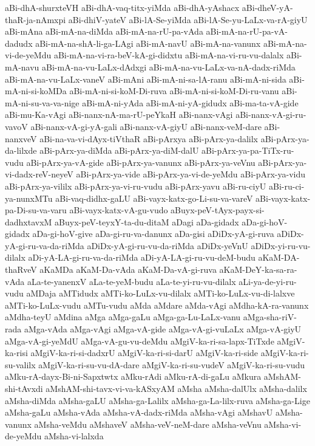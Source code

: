 {aBi-dhA-shurxteVH
aBi-dhA-vaq-titx-yiMda
aBi-dhA-yAshacx
aBi-dheV-yA-thaR-ja-nAmxpi
aBi-dhiV-yateV
aBi-lA-Se-yiMda
aBi-lA-Se-yu-LaLx-va-rA-giyU
aBi-mAna
aBi-mA-na-diMda
aBi-mA-na-rU-pa-vAda
aBi-mA-na-rU-pa-vA-dadudx
aBi-mA-na-shA-li-ga-LAgi
aBi-mA-navU
aBi-mA-na-vanunx
aBi-mA-na-vi-de-yeMdu
aBi-mA-na-vi-ra-beV-kA-gi-didxtu
aBi-mA-na-vi-ru-vu-dalalx
aBi-mA-navu
aBi-mA-na-vu-LaLx-dAdxgi
aBi-mA-na-vu-LaLx-va-nA-dadx-riMda
aBi-mA-na-vu-LaLx-vaneV
aBi-mAni
aBi-mA-ni-sa-lA-ranu
aBi-mA-ni-sida
aBi-mA-ni-si-koMDa
aBi-mA-ni-si-koM-Di-ruva
aBi-mA-ni-si-koM-Di-ru-vanu
aBi-mA-ni-su-va-va-nige
aBi-mA-ni-yAda
aBi-mA-ni-yA-gidudx
aBi-ma-ta-vA-gide
aBi-mu-Ka-vAgi
aBi-nanx-nA-ma-rU-peYkaH
aBi-nanx-vAgi
aBi-nanx-vA-gi-ru-vavoV
aBi-nanx-vA-gi-yA-gali
aBi-nanx-vA-giyU
aBi-nanx-veM-dare
aBi-nanxveV
aBi-na-va-vi-dAyx-tiVthaR
aBi-pArxya
aBi-pArx-ya-dalilx
aBi-pArx-ya-da-lilxde
aBi-pArx-ya-diMda
aBi-pArx-ya-diM-dalU
aBi-pArx-ya-pa-TiTx-ru-vudu
aBi-pArx-ya-vA-gide
aBi-pArx-ya-vanunx
aBi-pArx-ya-veVnu
aBi-pArx-ya-vi-dadx-reV-neyeV
aBi-pArx-ya-vide
aBi-pArx-ya-vi-de-yeMdu
aBi-pArx-ya-vidu
aBi-pArx-ya-vililx
aBi-pArx-ya-vi-ru-vudu
aBi-pArx-yavu
aBi-ru-ciyU
aBi-ru-ci-ya-nunxMTu
aBi-vaq-didhx-gaLU
aBi-vayx-katx-go-Li-su-va-vareV
aBi-vayx-katx-pa-Di-su-va-varu
aBi-vayx-katx-vA-gu-vudo
aBuyx-peV-tAyx-payx-si-dadhxtavxM
aBuyx-peV-teyxY-ta-du-ditaM
aDagi
aDa-gidadx
aDa-gi-hoV-gidadx
aDa-gi-hoV-give
aDa-gi-ru-va-danunx
aDa-gisi
aDiDx-yA-gi-ruva
aDiDx-yA-gi-ru-va-da-riMda
aDiDx-yA-gi-ru-vu-da-riMda
aDiDx-yeVnU
aDiDx-yi-ru-vu-dilalx
aDi-yA-LA-gi-ru-va-da-riMda
aDi-yA-LA-gi-ru-vu-deM-budu
aKaM-DA-thaRveV
aKaMDa
aKaM-Da-vAda
aKaM-Da-vA-gi-ruva
aKaM-DeY-ka-sa-ra-vAda
aLa-te-yanenxV
aLa-te-yeM-budu
aLa-te-yi-ru-vu-dilalx
aLi-ya-de-yi-ru-vudu
aMDaja
aMTidudx
aMTi-ko-LuLx-vu-dilalx
aMTi-ko-LuLx-vu-di-lalxve
aMTi-ko-LuLx-vudu
aMTu-vudu
aMda
aMdare
aMda-vAgi
aMdha-kA-ra-vanunx
aMdha-teyU
aMdina
aMga
aMga-gaLu
aMga-ga-Lu-LaLx-vanu
aMga-sha-riV-rada
aMga-vAda
aMga-vAgi
aMga-vA-gide
aMga-vA-gi-vuLaLx
aMga-vA-giyU
aMga-vA-gi-yeMdU
aMga-vA-gu-vu-deMdu
aMgiV-ka-ri-sa-lapx-TiTxde
aMgiV-ka-risi
aMgiV-ka-ri-si-dadxrU
aMgiV-ka-ri-si-darU
aMgiV-ka-ri-side
aMgiV-ka-ri-su-valilx
aMgiV-ka-ri-su-vu-dA-dare
aMgiV-ka-ri-su-vudeV
aMgiV-ka-ri-su-vudu
aMku-rA-dayx-Bi-ni-Sapxtwtx
aMku-rAdi
aMku-rA-di-gaLu
aMkura
aMshAM-shi-tAvxdi
aMshAM-shi-tavx-vi-va-kASxyAM
aMsha
aMsha-dalUlx
aMsha-dalilx
aMsha-diMda
aMsha-gaLU
aMsha-ga-Lalilx
aMsha-ga-La-lilx-ruva
aMsha-ga-Lige
aMsha-gaLu
aMsha-vAda
aMsha-vA-dadx-riMda
aMsha-vAgi
aMshavU
aMsha-vanunx
aMsha-veMdu
aMshaveV
aMsha-veV-neM-dare
aMsha-veVnu
aMsha-vi-de-yeMdu
aMsha-vi-lalxda
}
